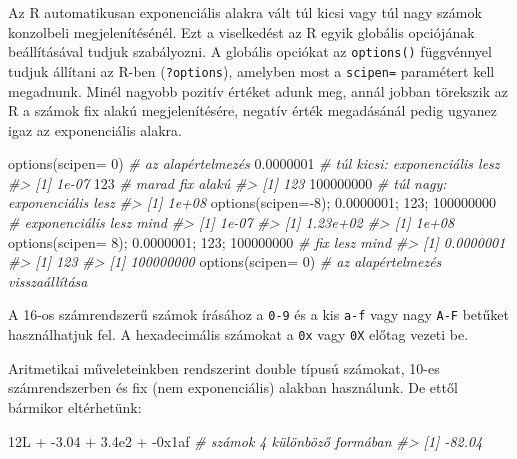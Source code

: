 \documentclass[
]{book}
\newenvironment{Shaded}{\begin{snugshade}}{\end{snugshade}}
\newcommand{\AttributeTok}[1]{\textcolor[rgb]{0.77,0.63,0.00}{#1}}
\newcommand{\CommentTok}[1]{\textcolor[rgb]{0.56,0.35,0.01}{\textit{#1}}}
\newcommand{\DecValTok}[1]{\textcolor[rgb]{0.00,0.00,0.81}{#1}}
\newcommand{\FloatTok}[1]{\textcolor[rgb]{0.00,0.00,0.81}{#1}}
\newcommand{\FunctionTok}[1]{\textcolor[rgb]{0.00,0.00,0.00}{#1}}
\newcommand{\NormalTok}[1]{#1}
\newcommand{\SpecialCharTok}[1]{\textcolor[rgb]{0.00,0.00,0.00}{#1}}
\begin{document}
Az R automatikusan exponenciális alakra vált túl kicsi vagy túl nagy számok konzolbeli megjelenítésénél. Ezt a viselkedést az R egyik globális opciójának beállításával tudjuk szabályozni. A globális opciókat az \texttt{options()} függvénnyel tudjuk állítani az R-ben (\texttt{?options}), amelyben most a \texttt{scipen=} paramétert kell megadnunk. Minél nagyobb pozitív értéket adunk meg, annál jobban törekszik az R a számok fix alakú megjelenítésére, negatív érték megadásánál pedig ugyanez igaz az exponenciális alakra.

\begin{Shaded}
\begin{Highlighting}[]
\FunctionTok{options}\NormalTok{(}\AttributeTok{scipen=} \DecValTok{0}\NormalTok{)       }\CommentTok{\# az alapértelmezés}
\FloatTok{0.0000001}                \CommentTok{\# túl kicsi: exponenciális lesz}
\CommentTok{\#\textgreater{} [1] 1e{-}07}
\DecValTok{123}                      \CommentTok{\# marad fix alakú }
\CommentTok{\#\textgreater{} [1] 123}
\DecValTok{100000000}                \CommentTok{\# túl nagy: exponenciális lesz}
\CommentTok{\#\textgreater{} [1] 1e+08}
\FunctionTok{options}\NormalTok{(}\AttributeTok{scipen=}\SpecialCharTok{{-}}\DecValTok{8}\NormalTok{); }\FloatTok{0.0000001}\NormalTok{; }\DecValTok{123}\NormalTok{; }\DecValTok{100000000} \CommentTok{\# exponenciális lesz mind}
\CommentTok{\#\textgreater{} [1] 1e{-}07}
\CommentTok{\#\textgreater{} [1] 1.23e+02}
\CommentTok{\#\textgreater{} [1] 1e+08}
\FunctionTok{options}\NormalTok{(}\AttributeTok{scipen=} \DecValTok{8}\NormalTok{); }\FloatTok{0.0000001}\NormalTok{; }\DecValTok{123}\NormalTok{; }\DecValTok{100000000} \CommentTok{\# fix lesz mind}
\CommentTok{\#\textgreater{} [1] 0.0000001}
\CommentTok{\#\textgreater{} [1] 123}
\CommentTok{\#\textgreater{} [1] 100000000}
\FunctionTok{options}\NormalTok{(}\AttributeTok{scipen=} \DecValTok{0}\NormalTok{)       }\CommentTok{\# az alapértelmezés visszaállítása}
\end{Highlighting}
\end{Shaded}

A 16-os számrendszerű számok írásához a \texttt{0-9} és a kis \texttt{a-f} vagy nagy \texttt{A-F} betűket használhatjuk fel. A hexadecimális számokat a \texttt{0x} vagy \texttt{0X} előtag vezeti be.

Aritmetikai műveleteinkben rendszerint double típusú számokat, 10-es számrendszerben és fix (nem exponenciális) alakban használunk. De ettől bármikor eltérhetünk:

\begin{Shaded}
\begin{Highlighting}[]
\NormalTok{12L }\SpecialCharTok{+} \SpecialCharTok{{-}}\FloatTok{3.04} \SpecialCharTok{+} \FloatTok{3.4e2} \SpecialCharTok{+} \SpecialCharTok{{-}}\DecValTok{0x1af}  \CommentTok{\# számok 4 különböző formában}
\CommentTok{\#\textgreater{} [1] {-}82.04}
\end{Highlighting}
\end{Shaded}
\end{document}
